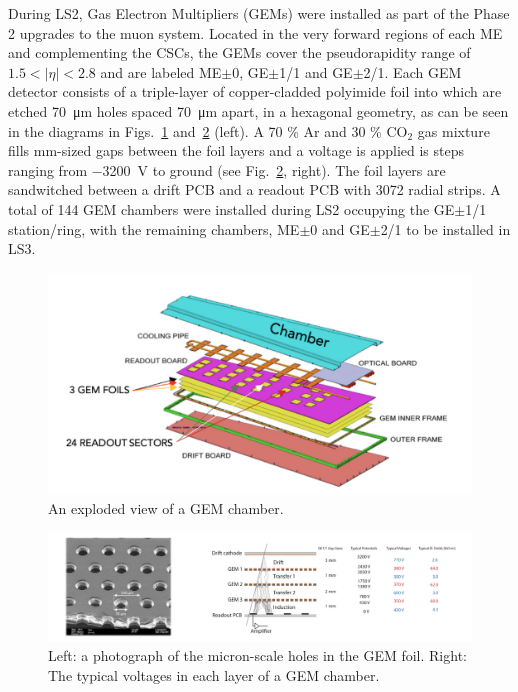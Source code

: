 During LS2, Gas Electron Multipliers (GEMs) \cite{GEM} were installed as part of the Phase 2 upgrades to the muon system. Located in the very forward regions of each ME and complementing the CSCs, the GEMs cover the pseudorapidity range of $1.5<|\eta|<2.8$ and are labeled ME$\pm$0, GE$\pm$1/1 and GE$\pm$2/1. Each GEM detector consists of a triple-layer of copper-cladded polyimide foil into which are etched \SI{70}{\micro \meter} holes spaced \SI{70}{\micro\meter} apart, in a hexagonal geometry, as can be seen in the diagrams in Figs.~\ref{fig:GEMDiagram} and~\ref{fig:GEMDiagram2} (left). A 70 \% Ar and 30 \% CO$_2$ gas mixture fills mm-sized gaps between the foil layers and a voltage is applied is steps ranging from \SI{-3200}{V} to ground (see Fig.~\ref{fig:GEMDiagram2}, right). The foil layers are sandwitched between a drift PCB and a readout PCB with 3072 radial strips. A total of 144 GEM chambers were installed during LS2 occupying the GE$\pm$1/1 station/ring, with the remaining chambers, ME$\pm$0 and GE$\pm$2/1 to be installed in LS3. 

\begin{figure}[H]
    \centering
    \includegraphics[width=\textwidth]{Images/CMS/GEMDiagram.png}
    \caption{An exploded view of a GEM chamber.}
    \label{fig:GEMDiagram}
\end{figure}

\begin{figure}[H]
    \centering
    \includegraphics[width=\textwidth]{Images/CMS/GEMDiagram2.png}
    \caption{Left: a photograph of the micron-scale holes in the GEM foil. Right: The typical voltages in each layer of a GEM chamber.}
    \label{fig:GEMDiagram2}
\end{figure}